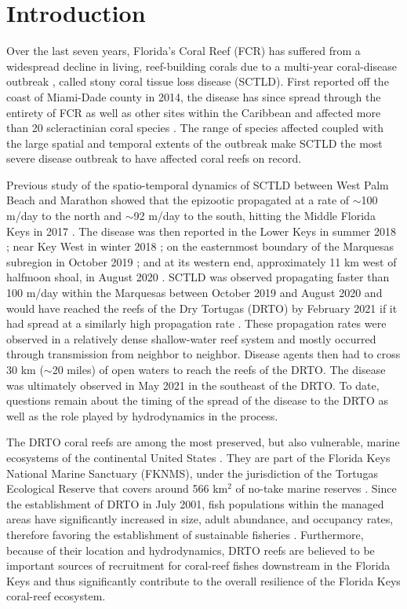 \section{Introduction}
Over the last seven years, Florida's Coral Reef (FCR) has suffered from a widespread decline in living, reef-building corals due to a multi-year coral-disease outbreak \citep{precht2016unprecedented,walton2018impacts}, called stony coral tissue loss disease (SCTLD). First reported off the coast of Miami-Dade county in 2014, the disease has since spread through the entirety of FCR as well as other sites within the Caribbean \citep{alvarez2019rapid,kramer2019map,estrada2020reef} and affected more than 20 scleractinian coral species \citep{noaa2018}. The range of species affected coupled with the large spatial and temporal extents of the outbreak make SCTLD the most severe disease outbreak to have affected coral reefs on record.

Previous study of the spatio-temporal dynamics of SCTLD between West Palm Beach and Marathon showed that the epizootic propagated at a rate of $\sim$100 m/day to the north and $\sim$92 m/day to the south, hitting the Middle Florida Keys in 2017 \citep{muller2020spatial}. The disease was then reported in the Lower Keys in summer 2018 \citep{frrp2018}; near Key West in winter 2018 \citep{frrp2018}; on the easternmost boundary of the Marquesas subregion in October 2019 \citep{frrp2019}; and at its western end, approximately 11 km west of halfmoon shoal, in August 2020 \citep{frrp2020}. SCTLD was observed propagating faster than 100 m/day within the Marquesas between October 2019 and August 2020 and would have reached the reefs of the Dry Tortugas (DRTO) by February 2021 if it had spread at a similarly high propagation rate \citep{kramer2019map}. These propagation rates were observed in a relatively dense shallow-water reef system and mostly occurred through transmission from neighbor to neighbor. Disease agents then had to cross 30 km ($\sim$20 miles) of open waters to reach the reefs of the DRTO. The disease was ultimately observed in May 2021 \citep{kramer2019map} in the southeast of the DRTO. To date, questions remain about the timing of the spread of the disease to the DRTO as well as the role played by hydrodynamics in the process.

The DRTO coral reefs are among the most preserved, but also vulnerable, marine ecosystems of the continental United States \citep{kourafalou2018physical}. They are part of the Florida Keys National Marine Sanctuary (FKNMS), under the jurisdiction of the Tortugas Ecological Reserve that covers around 566 km$^2$ of no-take marine reserves \citep{ault2006building}. Since the establishment of DRTO in July 2001, fish populations within the managed areas have significantly increased in size, adult abundance, and occupancy rates, therefore favoring the establishment of sustainable fisheries \citep{ault2013assessing}. Furthermore, because of their location and hydrodynamics, DRTO reefs are believed to be important sources of recruitment for coral-reef fishes downstream in the Florida Keys \citep{domeier2004potential} and thus significantly contribute to the overall resilience of the Florida Keys coral-reef ecosystem.

